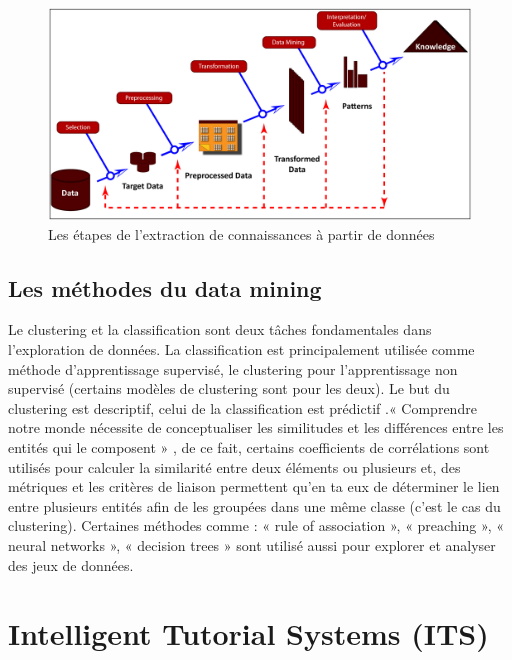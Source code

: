 \begin{figure}[H]
	\begin{center}
		\includegraphics[width=\textwidth]{images/chapitre1/extract_data_steps.png}
	\end{center}
\caption{Les étapes de l'extraction de connaissances à partir de données}
\label{extraction_connaissances}
\end{figure}

\subsection{Les méthodes du data mining}
Le clustering et la classification sont deux tâches fondamentales dans l’exploration de données. La classification est principalement utilisée comme méthode d’apprentissage supervisé,
le clustering pour l’apprentissage non supervisé (certains modèles de clustering sont pour les deux). Le but du clustering est descriptif, celui de la classification est prédictif \cite{veyssieres1998identification}.« Comprendre notre monde nécessite de conceptualiser les similitudes et les différences entre les entités qui le composent » \cite{Educational_data_mining_a_survey_from_1995_to_2005}, de ce fait, certains coefficients de corrélations sont utilisés pour calculer la similarité entre deux éléments ou plusieurs et, des métriques et les critères de liaison permettent qu’en ta eux de déterminer le lien entre plusieurs entités afin de les groupées dans une même classe (c’est le cas du clustering). Certaines méthodes comme : « rule of association », « preaching », « neural networks », « decision trees » sont utilisé aussi pour explorer et analyser des jeux de données.


\section{Intelligent Tutorial Systems (ITS)}

